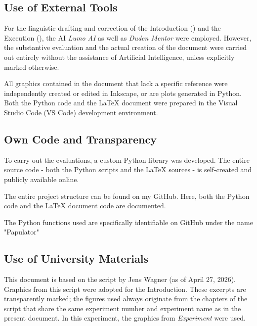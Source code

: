 \label{ch:Preface}

\subsection*{Use of External Tools}
For the linguistic drafting and correction of the Introduction () and the Execution (), the AI \textit{Lumo AI} as well as \textit{Duden Mentor} were employed. However, the substantive evaluation and the actual creation of the document were carried out entirely without the assistance of Artificial Intelligence, unless explicitly marked otherwise. \cite{Duden,Lumo}

All graphics contained in the document that lack a specific reference were independently created or edited in Inkscape, or are plots generated in Python. Both the Python code and the LaTeX document were prepared in the Visual Studio Code (VS Code) development environment.


\subsection*{Own Code and Transparency}
To carry out the evaluations, a custom Python library was developed. The entire source code - both the Python scripts and the LaTeX sources - is self-created and publicly available online.

The entire project structure can be found on my GitHub. Here, both the Python code and the LaTeX document code are documented. \cite{githubPAP2}

The Python functions used are specifically identifiable on GitHub under the name "Papulator" \cite{Papulator}

\subsection*{Use of University Materials}
This document is based on the script by Jens Wagner (as of April 27, 2026). Graphics from this script were adopted for the Introduction. These excerpts are transparently marked; the figures used always originate from the chapters of the script that share the same experiment number and experiment name as in the present document. In this experiment, the graphics from \emph{Experiment \versuchsnummer \versuchsname{\versuchsnummer}} were used. \cite{skriptPAP21}